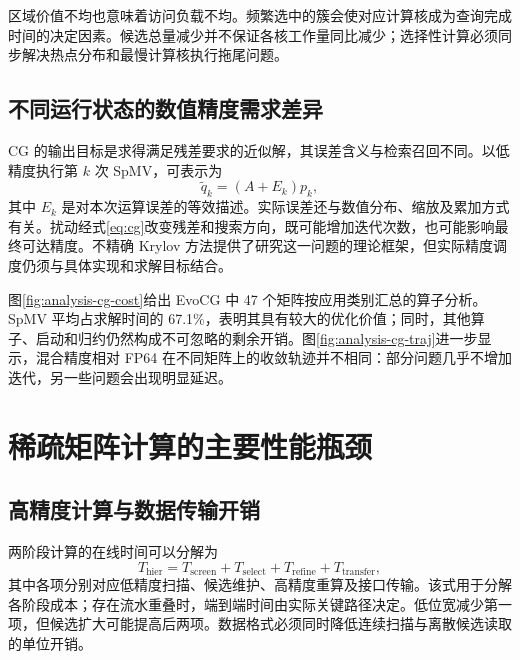 区域价值不均也意味着访问负载不均。频繁选中的簇会使对应计算核成为查询完成时间的决定因素。候选总量减少并不保证各核工作量同比减少；选择性计算必须同步解决热点分布和最慢计算核执行拖尾问题。

\subsection{不同运行状态的数值精度需求差异}
CG 的输出目标是求得满足残差要求的近似解，其误差含义与检索召回不同。以低精度执行第 $k$ 次 SpMV，可表示为
\begin{equation}
 \widetilde q_k=(A+E_k)p_k,
 \label{eq:perturbed}
\end{equation}
其中 $E_k$ 是对本次运算误差的等效描述。实际误差还与数值分布、缩放及累加方式有关。扰动经式\eqref{eq:cg}改变残差和搜索方向，既可能增加迭代次数，也可能影响最终可达精度。不精确 Krylov 方法提供了研究这一问题的理论框架\cite{simoncini2003,bouras2005}，但实际精度调度仍须与具体实现和求解目标结合。

图\ref{fig:analysis-cg-cost}给出 EvoCG 中 47 个矩阵按应用类别汇总的算子分析。SpMV 平均占求解时间的 67.1\%，表明其具有较大的优化价值；同时，其他算子、启动和归约仍然构成不可忽略的剩余开销。图\ref{fig:analysis-cg-traj}进一步显示，混合精度相对 FP64 在不同矩阵上的收敛轨迹并不相同：部分问题几乎不增加迭代，另一些问题会出现明显延迟\cite{evocg2027}。



\section{稀疏矩阵计算的主要性能瓶颈}
\subsection{高精度计算与数据传输开销}
两阶段计算的在线时间可以分解为
\begin{equation}
 T_{\mathrm{hier}}=T_{\mathrm{screen}}+T_{\mathrm{select}}+T_{\mathrm{refine}}+T_{\mathrm{transfer}},
 \label{eq:hiercost}
\end{equation}
其中各项分别对应低精度扫描、候选维护、高精度重算及接口传输。该式用于分解各阶段成本；存在流水重叠时，端到端时间由实际关键路径决定。低位宽减少第一项，但候选扩大可能提高后两项。数据格式必须同时降低连续扫描与离散候选读取的单位开销。

